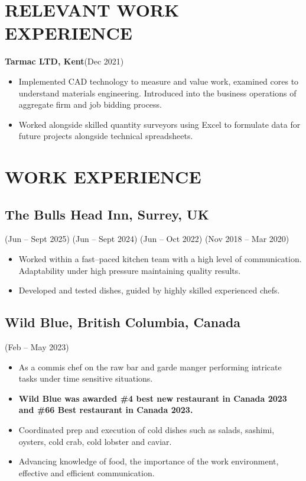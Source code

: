 \documentclass[../main.tex]{subfiles}
\begin{document}

\section*{RELEVANT WORK EXPERIENCE}

    \textbf{Tarmac LTD, Kent}(Dec 2021)
    \begin{itemize}
        \item Implemented CAD technology to measure and value work, examined cores to understand materials engineering. Introduced into the business operations of aggregate firm and job bidding process.
        \item Worked alongside skilled quantity surveyors using Excel to formulate data for future projects alongside technical spreadsheets.
    \end{itemize}


\section*{WORK EXPERIENCE}

    \subsection*{The Bulls Head Inn, Surrey, UK}(Jun – Sept 2025) (Jun – Sept 2024) (Jun – Oct 2022) (Nov 2018 – Mar 2020)
    \begin{itemize}[noitemsep]
        \item Worked within a fast--paced kitchen team with a high level of communication. Adaptability under high pressure maintaining quality results.
        \item Developed and tested dishes, guided by highly skilled experienced chefs.
    \end{itemize}
    \subsection*{Wild Blue, British Columbia, Canada}(Feb -- May 2023)
    \begin{itemize}[noitemsep, topsep=0pt]
        \item As a commis chef on the raw bar and garde manger performing intricate tasks under time sensitive situations.
        \item \textbf{Wild Blue was awarded \#4 best new restaurant in Canada 2023 and \#66 Best restaurant in Canada 2023.}
        \item Coordinated prep and execution of cold dishes such as salads, sashimi, oysters, cold crab, cold lobster and caviar.
        \item Advancing knowledge of food, the importance of the work environment, effective and efficient communication.
    \end{itemize}
\end{document}
